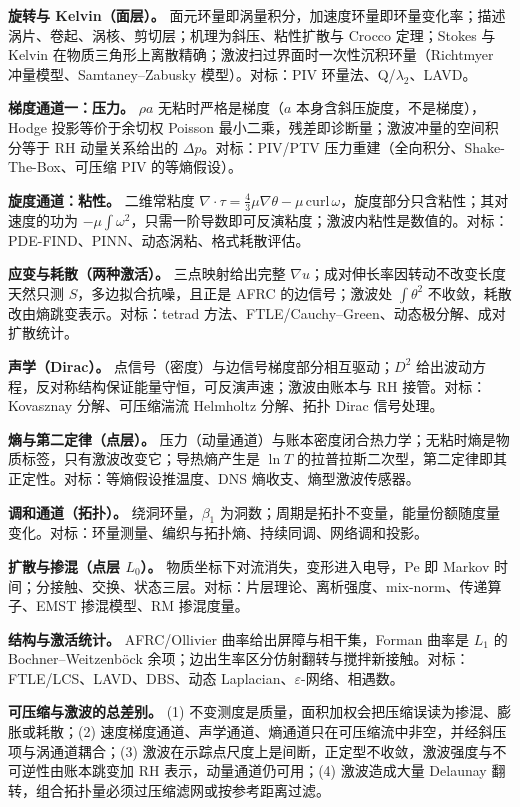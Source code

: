 \documentclass[11pt,a4paper]{article}
\begin{document}
\textbf{旋转与 Kelvin（面层）。} 面元环量即涡量积分，加速度环量即环量变化率；描述涡片、卷起、涡核、剪切层；机理为斜压、粘性扩散与 Crocco 定理；Stokes 与 Kelvin 在物质三角形上离散精确；激波扫过界面时一次性沉积环量（Richtmyer 冲量模型、Samtaney–Zabusky 模型）。对标：PIV 环量法、Q/$\lambda_2$、LAVD。

\textbf{梯度通道一：压力。} $\rho a$ 无粘时严格是梯度（$a$ 本身含斜压旋度，不是梯度），Hodge 投影等价于余切权 Poisson 最小二乘，残差即诊断量；激波冲量的空间积分等于 RH 动量关系给出的 $\Delta p$。对标：PIV/PTV 压力重建（全向积分、Shake-The-Box、可压缩 PIV 的等熵假设）。

\textbf{旋度通道：粘性。} 二维常粘度 $\nabla\cdot\tau=\tfrac43\mu\nabla\theta-\mu\,\mathrm{curl}\,\omega$，旋度部分只含粘性；其对速度的功为 $-\mu\int\omega^2$，只需一阶导数即可反演粘度；激波内粘性是数值的。对标：PDE-FIND、PINN、动态涡粘、格式耗散评估。

\textbf{应变与耗散（两种激活）。} 三点映射给出完整 $\nabla u$；成对伸长率因转动不改变长度天然只测 $S$，多边拟合抗噪，且正是 AFRC 的边信号；激波处 $\int\theta^2$ 不收敛，耗散改由熵跳变表示。对标：tetrad 方法、FTLE/Cauchy–Green、动态极分解、成对扩散统计。

\textbf{声学（Dirac）。} 点信号（密度）与边信号梯度部分相互驱动；$D^2$ 给出波动方程，反对称结构保证能量守恒，可反演声速；激波由账本与 RH 接管。对标：Kovasznay 分解、可压缩湍流 Helmholtz 分解、拓扑 Dirac 信号处理。

\textbf{熵与第二定律（点层）。} 压力（动量通道）与账本密度闭合热力学；无粘时熵是物质标签，只有激波改变它；导热熵产生是 $\ln T$ 的拉普拉斯二次型，第二定律即其正定性。对标：等熵假设推温度、DNS 熵收支、熵型激波传感器。

\textbf{调和通道（拓扑）。} 绕洞环量，$\beta_1$ 为洞数；周期是拓扑不变量，能量份额随度量变化。对标：环量测量、编织与拓扑熵、持续同调、网络调和投影。

\textbf{扩散与掺混（点层 $L_0$）。} 物质坐标下对流消失，变形进入电导，Pe 即 Markov 时间；分接触、交换、状态三层。对标：片层理论、离析强度、mix-norm、传递算子、EMST 掺混模型、RM 掺混度量。

\textbf{结构与激活统计。} AFRC/Ollivier 曲率给出屏障与相干集，Forman 曲率是 $L_1$ 的 Bochner–Weitzenböck 余项；边出生率区分仿射翻转与搅拌新接触。对标：FTLE/LCS、LAVD、DBS、动态 Laplacian、$\varepsilon$-网络、相遇数。

\textbf{可压缩与激波的总差别。} (1) 不变测度是质量，面积加权会把压缩误读为掺混、膨胀或耗散；(2) 速度梯度通道、声学通道、熵通道只在可压缩流中非空，并经斜压项与涡通道耦合；(3) 激波在示踪点尺度上是间断，正定型不收敛，激波强度与不可逆性由账本跳变加 RH 表示，动量通道仍可用；(4) 激波造成大量 Delaunay 翻转，组合拓扑量必须过压缩滤网或按参考距离过滤。
\end{document}
